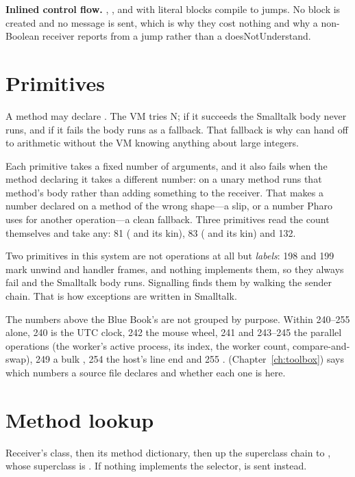 \textbf{Inlined control flow.} , ,  and
 with literal blocks compile to jumps. No block is created and no
message is sent, which is why they cost nothing and why a non-Boolean receiver
reports  from a jump rather than a doesNotUnderstand.

\section{Primitives}

A method may declare . The VM tries N; if it succeeds the
Smalltalk body never runs, and if it fails the body runs as a fallback. That
fallback is why  can hand off to 
arithmetic without the VM knowing anything about large integers.

Each primitive takes a fixed number of arguments, and it also fails when the
method declaring it takes a different number:  on a unary
method runs that method's body rather than adding something to the receiver.
That makes a number declared on a method of the wrong shape---a slip, or a
number Pharo uses for another operation---a clean fallback. Three primitives
read the count themselves and take any: 81 ( and its
kin), 83 ( and its kin) and 132.

Two primitives in this system are not operations at all but \emph{labels}: 198
and 199 mark unwind and handler frames, and nothing implements them, so they
always fail and the Smalltalk body runs. Signalling finds them by walking the
sender chain. That is how exceptions are written in Smalltalk.

The numbers above the Blue Book's are not grouped by purpose. Within 240--255
alone, 240 is the UTC clock, 242 the mouse wheel, 241 and 243--245 the
parallel operations (the worker's active process, its index, the worker count,
compare-and-swap), 249 a bulk , 254 the host's line end and 255
.  (Chapter~\ref{ch:toolbox}) says which
numbers a source file declares and whether each one is here.

\section{Method lookup}

Receiver's class, then its method dictionary, then up the superclass chain to
, whose superclass is . If nothing implements the selector,
 is sent instead.

